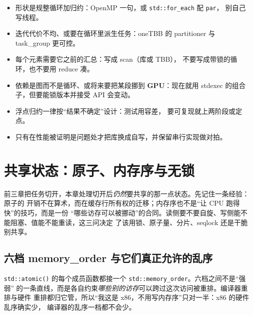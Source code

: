 \documentclass[12pt,a4paper,fontset=fandol]{ctexbook}
\newcommand{\Fn}[1]{\texttt{#1()}}
\newcommand{\Tp}[1]{\texttt{#1}}
\newcommand{\Dom}[1]{\textsf{\bfseries #1}}
\newcommand{\GPU}{\Dom{GPU}}
\begin{document}
\begin{guideline}[title={选循环并行工具的判据}]
\begin{itemize}
  \item 形状是规整循环加归约：OpenMP 一句，或 \Tp{std::for\_each} 配 \Tp{par}，
        别自己写线程。
  \item 迭代代价不均、或要在循环里派生任务：oneTBB 的 partitioner
        与 task\_group 更可控。
  \item 每个元素需要它之前的汇总：写成 scan（库或 TBB），
        不要写成带锁的循环，也不要用 reduce 凑。
  \item 依赖是图而不是循环、或将来要把某段挪到 \GPU{}：现在就用 stdexec
        的组合子，但要能锁版本并接受 API 会变动。
  \item 浮点归约一律按``结果不确定''设计：测试用容差，
        要可复现就上两阶段或定点。
  \item 只有在性能被证明是问题处才把库换成自写，并保留串行实现做对拍。
\end{itemize}
\end{guideline}
\chapter{共享状态：原子、内存序与无锁}

前三章把任务切开，本章处理切开后\emph{仍然}要共享的那一点状态。先记住一条经验：原子的
开销不在算术，而在缓存行所有权的迁移；内存序也不是``让 CPU 跑得快''的技巧，而是一份
``哪些访存可以被挪动''的合同。读侧要不要自旋、写侧能不能阻塞、值能不能重读，这三问决定
了该用锁、原子量、分片、seqlock 还是干脆别共享。

\section{六档 memory\_order 与它们真正允许的乱序}

\Fn{std::atomic} 的每个成员函数都接一个 \Tp{std::memory\_order}。六档之间不是``强弱''
的一条直线，而是各自约束\emph{哪些别的访存}可以跨过这次访问被重排。编译器重排与硬件
重排都归它管，所以``我这是 x86，不用写内存序''只对一半：x86 的硬件乱序确实少，
编译器的乱序一档都不会少。
\end{document}
